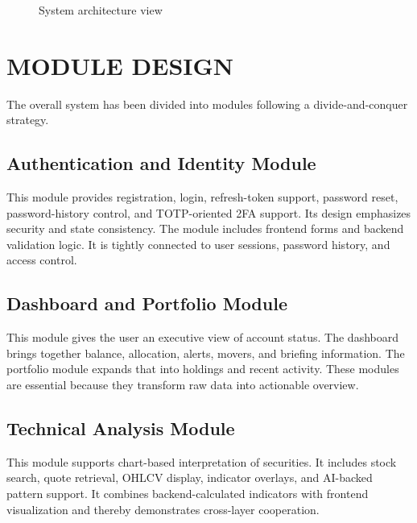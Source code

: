 \documentclass[12pt,a4paper]{report}
\begin{document}
\begin{figure}[H]
\centering
{}
\caption{System architecture view}
\end{figure}

\section{MODULE DESIGN}
The overall system has been divided into modules following a divide-and-conquer strategy.

\subsection{Authentication and Identity Module}
This module provides registration, login, refresh-token support, password reset, password-history control, and TOTP-oriented 2FA support. Its design emphasizes security and state consistency. The module includes frontend forms and backend validation logic. It is tightly connected to user sessions, password history, and access control.

\subsection{Dashboard and Portfolio Module}
This module gives the user an executive view of account status. The dashboard brings together balance, allocation, alerts, movers, and briefing information. The portfolio module expands that into holdings and recent activity. These modules are essential because they transform raw data into actionable overview.

\subsection{Technical Analysis Module}
This module supports chart-based interpretation of securities. It includes stock search, quote retrieval, OHLCV display, indicator overlays, and AI-backed pattern support. It combines backend-calculated indicators with frontend visualization and thereby demonstrates cross-layer cooperation.
\end{document}
